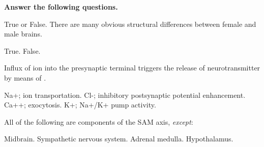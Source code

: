 \documentclass[answers]{exam}
\begin{document}
\begin{questions}
\newpage

\textbf{Answer the following questions.}


\question True or False. There are many obvious structural differences between female and male brains.
\begin{choices}
\choice True.
\correctchoice False.
\end{choices}



\question Influx of \fillin ion into the presynaptic terminal triggers the release of neurotransmitter by means of \fillin.
\begin{choices}
\choice Na+; ion transportation.
\choice Cl-; inhibitory postsynaptic potential enhancement.
\correctchoice Ca++; exocytosis.
\choice K+; Na+/K+ pump activity.
\end{choices}



\question All of the following are components of the SAM axis, \emph{except}:
\begin{choices}
\correctchoice Midbrain.
\choice Sympathetic nervous system.
\choice Adrenal medulla.
\choice Hypothalamus.
\end{choices}


\end{questions}
\end{document}
